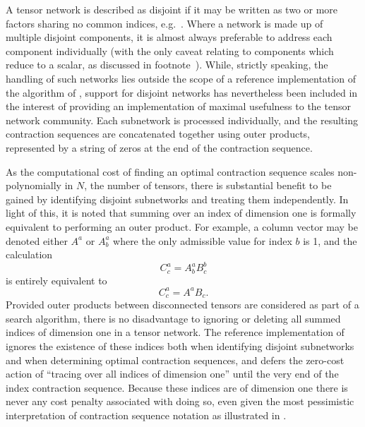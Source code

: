 
A tensor network is described as disjoint if it may be written as two or more factors sharing no common indices, e.g.~. Where a network is made up of multiple disjoint components, it is almost always preferable to address each component individually (with the only caveat relating to components which reduce to a scalar, as discussed in footnote~). While, strictly speaking, the handling of such networks lies outside the scope of a reference implementation of the algorithm of , support for disjoint networks has nevertheless been included in the interest of providing an implementation of maximal usefulness to the tensor network community. Each subnetwork is processed individually, and the resulting contraction sequences are concatenated together using outer products, represented by a string of zeros at the end of the contraction sequence.

As the computational cost of finding an optimal contraction sequence scales non-polynomially in $N$, the number of tensors, there is substantial benefit to be gained by identifying disjoint subnetworks and treating them independently. In light of this, it is noted that summing over an index of dimension one is formally equivalent to performing an outer product. For example, a column vector may be denoted either $A^a$ or $A^a_b$ where the only admissible value for index $b$ is 1, and the calculation
\begin{equation}
C^a_c = A^a_b B^b_c
\end{equation}
is entirely equivalent to
\begin{equation}
C^a_c = A^a B_c.
\end{equation}
Provided outer products between disconnected tensors are considered as part of a search algorithm, there is no disadvantage to ignoring or deleting all summed indices of dimension one in a tensor network. The reference implementation of  ignores the existence of these indices both when identifying disjoint subnetworks and when determining optimal contraction sequences, and defers the zero-cost action of ``tracing over all indices of dimension one'' until the very end of the index contraction sequence. Because these indices are of dimension one there is never any cost penalty associated with doing so, even given the most pessimistic interpretation of contraction sequence notation as illustrated in .

